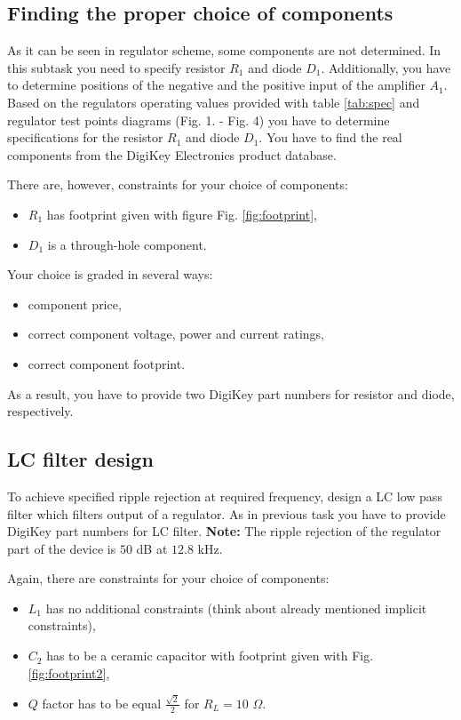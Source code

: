 \documentclass[a4paper]{article}
\begin{document}
\newpage

\subsection{Finding the proper choice of components}
\label{ele:task:1}
As it can be seen in regulator scheme, some components are not determined. In 
this subtask you need to specify resistor $R_1$ and diode $D_1$. Additionally, 
you have to determine positions of the negative and the positive input of the 
amplifier $A_1$. Based on the regulators operating values provided with table
\ref{tab:spec} and regulator test points diagrams (Fig. 1. - Fig. 4) you have 
to determine specifications for the resistor $R_1$ and diode $D_1$. You have to 
find the real components from the DigiKey Electronics product database. 

There are, however, constraints for your choice of components:
\begin{itemize}
\item $R_1$ has footprint given with figure Fig. \ref{fig:footprint},
\item $D_1$ is a through-hole component.
\end{itemize} 
 
Your choice is graded in several ways:
\begin{itemize}
\item component price,
\item correct component voltage, power and current ratings,
\item correct component footprint.
\end{itemize}
As a result, you have to provide two DigiKey part numbers for resistor and 
diode, respectively. 

\subsection{LC filter design}
\label{ele:task:2}
To achieve specified ripple rejection at required frequency, design a LC low 
pass filter which filters output of a regulator. As in previous task you have 
to provide DigiKey part numbers for LC filter. \textbf{Note:} The ripple 
rejection of the regulator part of the device is $50$ dB at $12.8$ kHz.

Again, there are constraints for your choice of components:
\begin{itemize}
\item $L_1$ has no additional constraints 
(think about already mentioned implicit constraints),
\item $C_2$ has to be a ceramic capacitor with footprint given with 
Fig. \ref{fig:footprint2},
\item $Q$ factor has to be equal $\frac{\sqrt{2}}{2}$ for $R_L = 10$ $\Omega$.  
\end{itemize}
\end{document}
